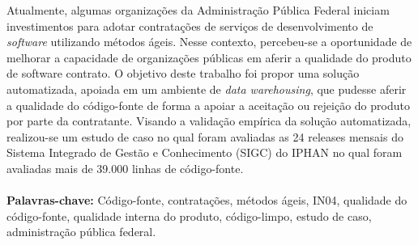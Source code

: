 \begin{resumo}

Atualmente, algumas organizações da Administração Pública Federal iniciam investimentos para adotar contratações de serviços de desenvolvimento de \textit{software} utilizando métodos ágeis. Nesse contexto, percebeu-se a oportunidade de melhorar a capacidade de organizações públicas em aferir a qualidade do produto de software contrato. O objetivo deste trabalho foi propor uma solução automatizada, apoiada em um ambiente de \textit{data warehousing}, que pudesse aferir a qualidade do código-fonte de forma a apoiar a aceitação ou rejeição do produto por parte da contratante. Visando a validação empírica da solução automatizada, realizou-se um estudo de caso no qual foram avaliadas as 24 releases mensais do Sistema Integrado de Gestão e Conhecimento (SIGC) do IPHAN no qual foram avaliadas mais de 39.000 linhas de código-fonte.
{
\\
\\
\textbf{Palavras-chave:} Código-fonte, contratações, métodos ágeis, IN04, qualidade do código-fonte, qualidade interna do produto, código-limpo, estudo de caso, administração pública federal.}
\end{resumo}

